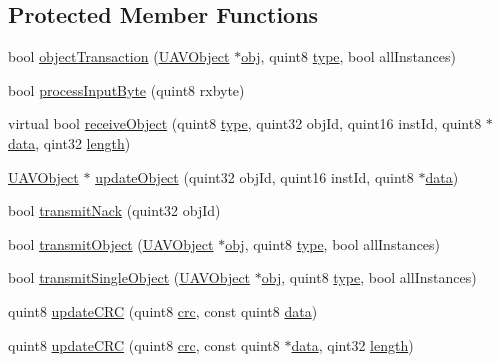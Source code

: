 \subsection*{Protected Member Functions}
\begin{DoxyCompactItemize}
\item 
bool \hyperlink{group___u_a_v_talk_plugin_gaf41ae2b1b8730f18bc3992d6777c0627}{object\-Transaction} (\hyperlink{class_u_a_v_object}{U\-A\-V\-Object} $\ast$\hyperlink{glext_8h_a0c0d4701a6c89f4f7f0640715d27ab26}{obj}, quint8 \hyperlink{glext_8h_a7d05960f4f1c1b11f3177dc963a45d86}{type}, bool all\-Instances)
\item 
bool \hyperlink{group___u_a_v_talk_plugin_ga39bcb007900ed377097079d21ffe3a68}{process\-Input\-Byte} (quint8 rxbyte)
\item 
virtual bool \hyperlink{group___u_a_v_talk_plugin_gaa95319b62b2b1a92e3f0ef753a1c04a3}{receive\-Object} (quint8 \hyperlink{glext_8h_a7d05960f4f1c1b11f3177dc963a45d86}{type}, quint32 obj\-Id, quint16 inst\-Id, quint8 $\ast$\hyperlink{glext_8h_a8850df0785e6fbcc2351af3b686b8c7a}{data}, qint32 \hyperlink{glext_8h_a3c8469415bbc83dd1341af15c67f1cef}{length})
\item 
\hyperlink{class_u_a_v_object}{U\-A\-V\-Object} $\ast$ \hyperlink{group___u_a_v_talk_plugin_ga06d53e41c45734baa38c0eb08d684af8}{update\-Object} (quint32 obj\-Id, quint16 inst\-Id, quint8 $\ast$\hyperlink{glext_8h_a8850df0785e6fbcc2351af3b686b8c7a}{data})
\item 
bool \hyperlink{group___u_a_v_talk_plugin_ga1ea574fb7b47dc949201d4c29b834208}{transmit\-Nack} (quint32 obj\-Id)
\item 
bool \hyperlink{group___u_a_v_talk_plugin_ga81519c2c45745383850ccec92be1eb6a}{transmit\-Object} (\hyperlink{class_u_a_v_object}{U\-A\-V\-Object} $\ast$\hyperlink{glext_8h_a0c0d4701a6c89f4f7f0640715d27ab26}{obj}, quint8 \hyperlink{glext_8h_a7d05960f4f1c1b11f3177dc963a45d86}{type}, bool all\-Instances)
\item 
bool \hyperlink{group___u_a_v_talk_plugin_ga474ec2f43670acca29d18ad9965b0440}{transmit\-Single\-Object} (\hyperlink{class_u_a_v_object}{U\-A\-V\-Object} $\ast$\hyperlink{glext_8h_a0c0d4701a6c89f4f7f0640715d27ab26}{obj}, quint8 \hyperlink{glext_8h_a7d05960f4f1c1b11f3177dc963a45d86}{type}, bool all\-Instances)
\item 
quint8 \hyperlink{group___u_a_v_talk_plugin_gae15db61cd3e3604aad8fbd52ddc68fff}{update\-C\-R\-C} (quint8 \hyperlink{uavobjecttemplate_8m_a6a3730e10b2455e9a8b6599785809fce}{crc}, const quint8 \hyperlink{glext_8h_a8850df0785e6fbcc2351af3b686b8c7a}{data})
\item 
quint8 \hyperlink{group___u_a_v_talk_plugin_gadefd185fb8609e37990694d45282ecd4}{update\-C\-R\-C} (quint8 \hyperlink{uavobjecttemplate_8m_a6a3730e10b2455e9a8b6599785809fce}{crc}, const quint8 $\ast$\hyperlink{glext_8h_a8850df0785e6fbcc2351af3b686b8c7a}{data}, qint32 \hyperlink{glext_8h_a3c8469415bbc83dd1341af15c67f1cef}{length})
\end{DoxyCompactItemize}

